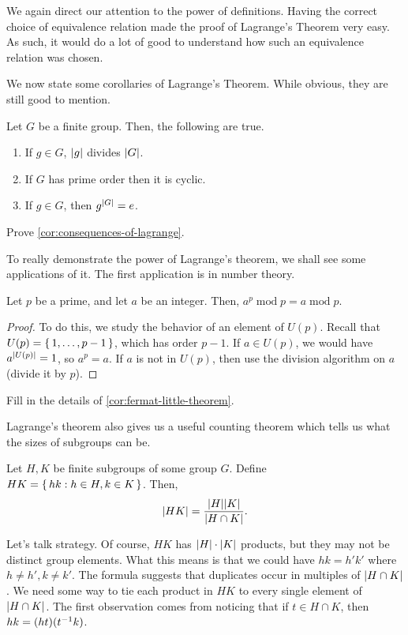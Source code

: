 \documentclass[./main.tex]{subfiles}
\begin{document}
We again direct our attention to the power of definitions. Having the correct
choice of equivalence relation made the proof of Lagrange's Theorem very easy.
As such, it would do a lot of good to understand how such an equivalence
relation was chosen.

We now state some corollaries of Lagrange's Theorem. While
obvious, they are still good to mention.
\begin{corollary}
\label{cor:consequences-of-lagrange}
    Let $G$ be a finite group. Then, the following are true.
    \begin{enumerate}
        \item If $g \in G$, $\abs{g}$ divides $\abs{G}$.
        \item If $G$ has prime order then it is cyclic.
        \item If $g \in G$, then $g^{\abs G} = e$.
    \end{enumerate}
\end{corollary}
\begin{exercise}
    Prove \cref{cor:consequences-of-lagrange}.
\end{exercise}

To really demonstrate the power of Lagrange's theorem, we shall see some
applications of it. The first application is in number theory. 

\begin{corollary}
\label{cor:fermat-little-theorem}
    Let $p$ be a prime, and let $a$ be an integer. Then, $a^p \operatorname{mod}
    p = a \operatorname{mod} p$.  
\end{corollary}
\begin{proof}
    To do this, we study the behavior of an element of $U(p)$. Recall that $U(p)
    = \set{1, \dots, p-1}$, which has order $p-1$. If $a \in U(p)$, we would
    have $a^{\abs{U(p)}} = 1$, so $a^p = a$. If $a$ is not in $U(p)$, then use
    the division algorithm on $a$ (divide it by $p$).
\end{proof}
\begin{exercise}
    Fill in the details of \cref{cor:fermat-little-theorem}.
\end{exercise}

Lagrange's theorem also gives us a useful counting theorem which tells us what
the sizes of subgroups can be.
\begin{theorem}[$HK$ theorem]
\label{thm:hk-theorem}
    Let $H, K$ be finite subgroups of some group $G$. Define $HK = \set{hk : h \in H, k \in K}$. Then, 
    \[
        \abs{HK} = \frac{\abs H \abs K}{\abs{H \cap K}}.
    \]
\end{theorem}
Let's talk strategy. Of course, $HK$ has $\abs H \cdot \abs K$ products, but
they may not be distinct group elements. What this means is that we could have
$hk = h' k'$ where $h \neq h', k \neq k'$. The formula suggests that duplicates
occur in multiples of $\abs{H \cap K}$. We need some way to tie each product in
$HK$ to every single element of $\abs{H \cap K}$. The first observation comes
from noticing that if $t \in H \cap K$, then $hk = (ht)(t^{-1} k)$. 
\end{document}
